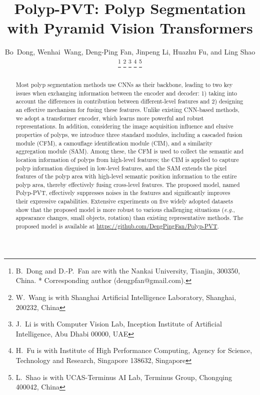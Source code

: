 \documentclass[journal]{IEEEtran}
\def\ourmodel{Polyp-PVT}
\begin{document}
\title{Polyp-PVT: Polyp Segmentation with Pyramid Vision Transformers}


\author{
Bo~Dong, 
Wenhai~Wang,
Deng-Ping Fan,
Jinpeng Li, 
Huazhu Fu,
and Ling Shao



\thanks{B.~Dong and D.-P.~Fan are with the Nankai University, Tianjin, 300350, China.
* Corresponding author (dengpfan@gmail.com).
}
\thanks{W.~Wang is with Shanghai Artificial Intelligence Laboratory, Shanghai, 200232, China}
\thanks{J.~Li is with Computer Vision Lab, Inception Institute of Artificial Intelligence, Abu Dhabi 00000, UAE}
\thanks{H.~Fu is with Institute of High Performance Computing, Agency for Science, Technology and Research, Singapore 138632, Singapore}
\thanks{L.~Shao is with UCAS-Terminus AI Lab, Terminus Group, Chongqing 400042, China}
}






\maketitle

\begin{abstract}

Most polyp segmentation methods use CNNs as their backbone, leading to two key issues when exchanging information between the encoder and decoder: 1) taking into account the differences in contribution between different-level features and 2) designing an effective mechanism for fusing these features.
Unlike existing CNN-based methods, we adopt a transformer encoder, which learns more powerful and robust representations.
In addition, considering the image acquisition influence and elusive properties of polyps, we introduce three standard modules, including a cascaded fusion module (CFM), a camouflage identification module (CIM), and a similarity aggregation module (SAM).
Among these, the CFM is used to collect the semantic and location information of polyps from high-level features; the CIM is applied to capture polyp information disguised in low-level features, and 
the SAM extends the pixel features of the polyp area with high-level semantic position information to the entire polyp area,
thereby effectively fusing cross-level features.
The proposed model, named \ourmodel, effectively suppresses noises in the features and significantly improves their expressive capabilities.
Extensive experiments on five widely adopted datasets show that the proposed model is more robust to various challenging situations (\emph{e.g.}, appearance changes, small objects, rotation) than existing representative methods. 
The proposed model is available at \url{https://github.com/DengPingFan/Polyp-PVT}.
\end{abstract}
\end{document}
